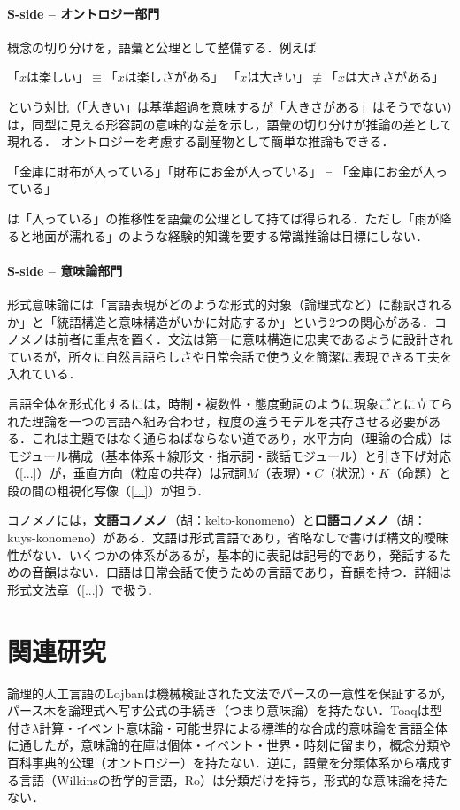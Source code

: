\documentclass[../main-detail.tex]{subfiles}
\begin{document}
\paragraph{S-side -- オントロジー部門}
概念の切り分けを，語彙と公理として整備する．例えば
\begin{exe}
    \ex 「$x$は楽しい」$\equiv$「$x$は楽しさがある」
    \ex 「$x$は大きい」$\not\equiv$「$x$は大きさがある」
\end{exe}
という対比（「大きい」は基準超過を意味するが「大きさがある」はそうでない）は，同型に見える形容詞の意味的な差を示し，語彙の切り分けが推論の差として現れる．
オントロジーを考慮する副産物として簡単な推論もできる．
\begin{exe}
    \ex 「金庫に財布が入っている」「財布にお金が入っている」$\vdash$「金庫にお金が入っている」
\end{exe}
は「入っている」の推移性を語彙の公理として持てば得られる．ただし「雨が降ると地面が濡れる」のような経験的知識を要する常識推論は目標にしない．

\paragraph{S-side -- 意味論部門}
形式意味論には「言語表現がどのような形式的対象（論理式など）に翻訳されるか」と「統語構造と意味構造がいかに対応するか」という2つの関心がある．コノメノは前者に重点を置く．文法は第一に意味構造に忠実であるように設計されているが，所々に自然言語らしさや日常会話で使う文を簡潔に表現できる工夫を入れている．

言語全体を形式化するには，時制・複数性・態度動詞のように現象ごとに立てられた理論を一つの言語へ組み合わせ，粒度の違うモデルを共存させる必要がある．これは主題ではなく通らねばならない道であり，水平方向（理論の合成）はモジュール構成（基本体系＋線形文・指示詞・談話モジュール）と引き下げ対応（\ref{...}）が，垂直方向（粒度の共存）は冠詞$M$（表現）・$C$（状況）・$K$（命題）と段の間の粗視化写像（\ref{...}）が担う．

コノメノには，\textbf{文語コノメノ}（胡：kelto-konomeno）と\textbf{口語コノメノ}（胡：kuys-konomeno）がある．文語は形式言語であり，省略なしで書けば構文的曖昧性がない．いくつかの体系があるが，基本的に表記は記号的であり，発話するための音韻はない．口語は日常会話で使うための言語であり，音韻を持つ．詳細は形式文法章（\ref{...}）で扱う．

\section{関連研究}
論理的人工言語のLojbanは機械検証された文法でパースの一意性を保証するが，パース木を論理式へ写す公式の手続き（つまり意味論）を持たない\cite{cll}．Toaqは型付き$\lambda$計算・イベント意味論・可能世界による標準的な合成的意味論を言語全体に通した\cite{toaq-refgram}が，意味論的在庫は個体・イベント・世界・時刻に留まり，概念分類や百科事典的公理（オントロジー）を持たない．逆に，語彙を分類体系から構成する言語（Wilkinsの哲学的言語\cite{wilkins1668}，Ro）は分類だけを持ち，形式的な意味論を持たない．
\end{document}
